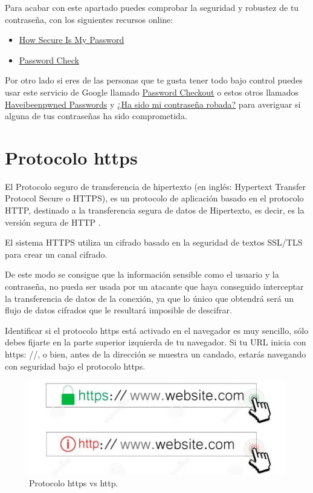 \documentclass[
  spanish,
  a4paper,
  openany]{book}
\begin{document}
Para acabar con este apartado puedes comprobar la seguridad y robustez de tu contraseña, con los siguientes recursos online:

\begin{itemize}
\item
  \href{https://www.security.org/how-secure-is-my-password/}{How Secure Is My Password}
\item
  \href{https://password.kaspersky.com/}{Password Check}
\end{itemize}

Por otro lado si eres de las personas que te gusta tener todo bajo control puedes usar este servicio de Google llamado \href{https://www.blog.google/technology/safety-security/google-password-checkup-cross-account-protection/}{Password Checkout} o estos otros llamados \href{https://haveibeenpwned.com/Passwords}{Haveibeenpwned Passwords} y \href{https://www.avast.com/hackcheck}{¿Ha sido mi contraseña robada?} para averiguar si alguna de tus contraseñas ha sido comprometida.

\hypertarget{protocolo-https}{%
\section{Protocolo https}\label{protocolo-https}}

El Protocolo seguro de transferencia de hipertexto (en inglés: Hypertext Transfer Protocol Secure o HTTPS), es un protocolo de aplicación basado en el protocolo HTTP, destinado a la transferencia segura de datos de Hipertexto, es decir, es la versión segura de HTTP \citep{WIKI-https}.

El sistema HTTPS utiliza un cifrado basado en la seguridad de textos SSL/TLS para crear un canal cifrado.

De este modo se consigue que la información sensible como el usuario y la contraseña, no pueda ser usada por un atacante que haya conseguido interceptar la transferencia de datos de la conexión, ya que lo único que obtendrá será un flujo de datos cifrados que le resultará imposible de descifrar.

Identificar si el protocolo https está activado en el navegador es muy sencillo, sólo debes fijarte en la parte superior izquierda de tu navegador. Si tu URL inicia con https: //, o bien, antes de la dirección se muestra un candado, estarás navegando con seguridad bajo el protocolo https.

\begin{figure}

{\centering \includegraphics[width=0.75\linewidth]{images/protocolo-https-http} 

}

\caption{Protocolo https vs http.}\label{fig:unnamed-chunk-10}
\end{figure}
\end{document}
